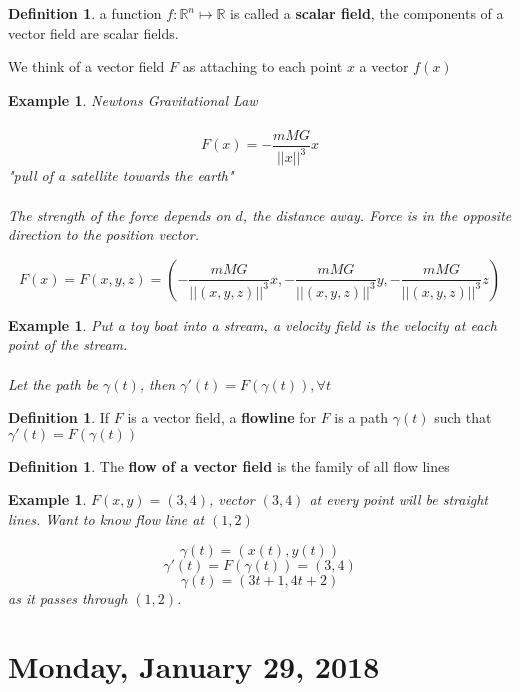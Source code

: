 \documentclass[12pt]{article}
\theoremstyle{plain}
\newtheorem{example}[theorem]{Example}
\theoremstyle{definition}
\newtheorem{definition}[theorem]{Definition}
\begin{document}
\begin{definition}
	a function $f: \mathbb{R}^n \mapsto \mathbb{R}$ is called a \textbf{scalar field}, the components of a vector field are scalar fields.
\end{definition}

We think of a vector field $F$ as attaching to each point $x$ a vector $f(x)$

\begin{example}
	Newtons Gravitational Law\\
	\\
	$$F(x) =  -\frac{mMG}{||x||^3} x$$
	"pull of a satellite towards the earth"\\
	\\
	The strength of the force depends on $d$, the distance away. Force is in the opposite direction to the position vector.

	$$F(x) = F(x,y,z) = (- \frac{mMG}{||(x,y,z)||^3}x, - \frac{mMG}{||(x,y,z)||^3}y, - \frac{mMG}{||(x,y,z)||^3}z)$$

\end{example}

\begin{example}
	Put a toy boat into a stream, a velocity field is the velocity at each point of the stream.\\
	\\
	Let the path be $\gamma (t)$, then $\gamma ' (t) = F(\gamma (t)), \forall t$
\end{example}

\begin{definition}
	If $F$ is a vector field, a \textbf{flowline} for $F$ is a path $\gamma (t)$ such that $\gamma ' (t) = F(\gamma (t))$
\end{definition}

\begin{definition}
	The \textbf{flow of a vector field} is the family of all flow lines
\end{definition}

\begin{example}
	$F(x,y) = (3,4)$, vector $(3,4)$ at every point will be straight lines. Want to know flow line at $(1,2)$

	$$\gamma (t) = (x(t), y(t))$$
	$$\gamma ' (t) = F(\gamma (t)) = (3,4)$$
	$$\gamma (t) = (3t + 1, 4t+2)$$
	as it passes through $(1,2)$.
\end{example}

\newpage

\section{Monday, January 29, 2018}
\end{document}
